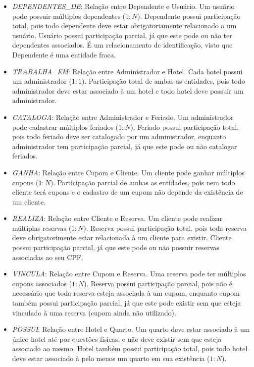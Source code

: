 \documentclass[a4paper, 12pt]{article}
\begin{document}
\begin{itemize}
    \item \emph{DEPENDENTES\_DE}: Relação entre Dependente e Usuário. Um usuário pode possuir múltiplos dependentes (\(1:N\)). Dependente possui participação total, pois todo dependente deve estar obrigatoriamente relacionado a um usuário. Usuário possui participação parcial, já que este pode ou não ter dependentes associados. É um relacionamento de identificação, visto que Dependente é uma entidade fraca.
    \item \emph{TRABALHA\_EM}: Relação entre Administrador e Hotel. Cada hotel possui um administrador (\(1:1\)). Participação total de ambas as entidades, pois todo administrador deve estar associado à um hotel e todo hotel deve possuir um administrador.
    \item \emph{CATALOGA}: Relação entre Administrador e Feriado. Um administrador pode cadastrar múltiplos feriados (\(1:N\)). Feriado possui participação total, pois todo feriado deve ser catalogado por um administrador, enquanto administrador tem participação parcial, já que este pode ou não catalogar feriados.
    \item \emph{GANHA}: Relação entre Cupom e Cliente. Um cliente pode ganhar múltiplos cupons (\(1:N\)). Participação parcial de ambas as entidades, pois nem todo cliente terá cupons e o cadastro de um cupom não depende da existência de um cliente.
    \item \emph{REALIZA}: Relação entre Cliente e Reserva. Um cliente pode realizar múltiplas reservas (\(1:N\)). Reserva possui participação total, pois toda reserva deve obrigatorimente estar relacionada à um cliente para existir. Cliente possui participação parcial, já que este pode ou não possuir reservas associadas ao seu CPF.
    \item \emph{VINCULA}: Relação entre Cupom e Reserva. Uma reserva pode ter múltiplos cupons associados (\(1:N\)). Reserva possui participação parcial, pois não é necessário que toda reserva esteja associada à um cupom, enquanto cupom também possui participação parcial, já que este pode existir sem que esteja vinculado à uma reserva (cupom ainda não utilizado).
    \item \emph{POSSUI}: Relação entre Hotel e Quarto. Um quarto deve estar associado à um único hotel até por questões físicas, e não deve existir sem que esteja associado ao mesmo. Hotel também possui participação total, pois todo hotel deve estar associado à pelo menos um quarto em sua existência (\(1:N\)).
    
\end{itemize}
\end{document}

